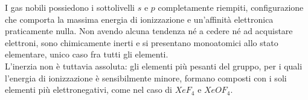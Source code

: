 I gas nobili possiedono i sottolivelli $s$ e $p$ completamente riempiti, configurazione che comporta la massima energia di ionizzazione e un'affinità elettronica praticamente nulla. 
Non avendo alcuna tendenza né a cedere né ad acquistare elettroni, sono chimicamente inerti e si presentano monoatomici allo stato elementare, unico caso fra tutti gli elementi.\\

L'inerzia non è tuttavia assoluta: gli elementi più pesanti del gruppo, per i quali l'energia di ionizzazione è sensibilmente minore, formano composti con i soli elementi più elettronegativi, come nel caso di $XeF_4$ e $XeOF_4$.